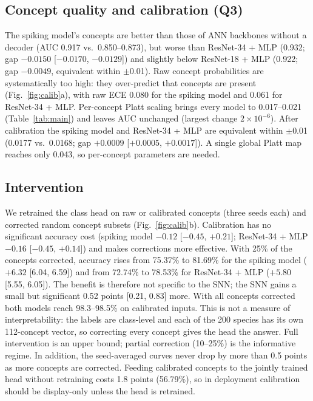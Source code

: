 \documentclass[conference]{IEEEtran}
\begin{document}
\subsection{Concept quality and calibration (Q3)}
The spiking model's concepts are better than those of ANN backbones without a decoder (AUC 0.917 vs.\ 0.850--0.873), but worse than ResNet-34 + MLP (0.932; gap $-0.0150$ [$-0.0170$, $-0.0129$]) and slightly below ResNet-18 + MLP (0.922; gap $-0.0049$, equivalent within $\pm$0.01). Raw concept probabilities are systematically too high: they over-predict that concepts are present (Fig.~\ref{fig:calib}a), with raw ECE 0.080 for the spiking model and 0.061 for ResNet-34 + MLP. Per-concept Platt scaling brings every model to 0.017--0.021 (Table~\ref{tab:main}) and leaves AUC unchanged (largest change $2\times10^{-6}$). After calibration the spiking model and ResNet-34 + MLP are equivalent within $\pm$0.01 (0.0177 vs.\ 0.0168; gap $+0.0009$ [$+0.0005$, $+0.0017$]). A single global Platt map reaches only 0.043, so per-concept parameters are needed.

\subsection{Intervention}\label{sec:interv}
We retrained the class head on raw or calibrated concepts (three seeds each) and corrected random concept subsets (Fig.~\ref{fig:calib}b). Calibration has no significant accuracy cost (spiking model $-0.12$ [$-0.45$, $+0.21$]; ResNet-34 + MLP $-0.16$ [$-0.45$, $+0.14$]) and makes corrections more effective. With 25\% of the concepts corrected, accuracy rises from 75.37\% to 81.69\% for the spiking model ($+6.32$ [6.04, 6.59]) and from 72.74\% to 78.53\% for ResNet-34 + MLP ($+5.80$ [5.55, 6.05]). The benefit is therefore not specific to the SNN; the SNN gains a small but significant 0.52 points [0.21, 0.83] more. With all concepts corrected both models reach 98.3--98.5\% on calibrated inputs. This is not a measure of interpretability: the labels are class-level and each of the 200 species has its own 112-concept vector, so correcting every concept gives the head the answer. Full intervention is an upper bound; partial correction (10--25\%) is the informative regime. In addition, the seed-averaged curves never drop by more than 0.5 points as more concepts are corrected. Feeding calibrated concepts to the jointly trained head without retraining costs 1.8 points (56.79\%), so in deployment calibration should be display-only unless the head is retrained.
\end{document}
